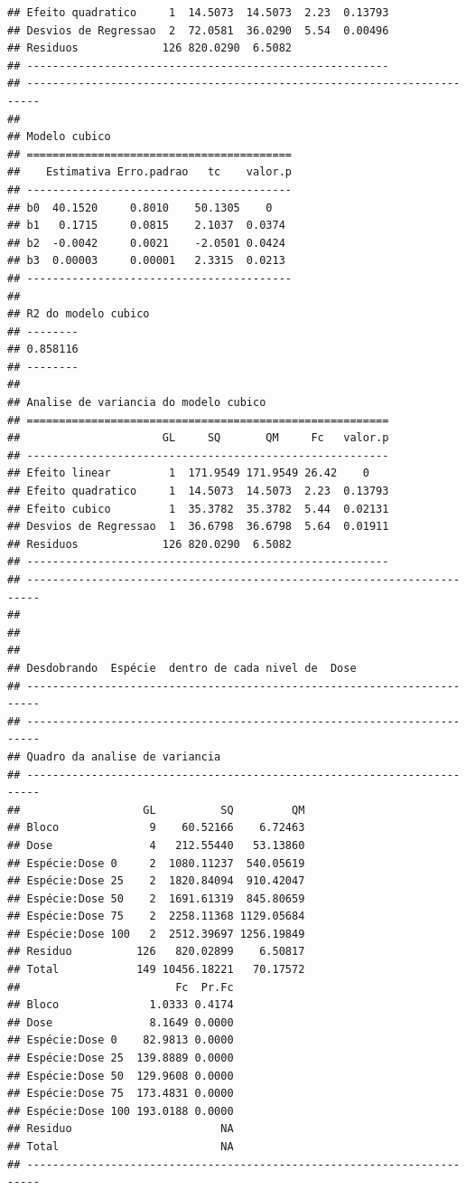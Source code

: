 \documentclass[
]{article}
\begin{document}
\begin{verbatim}
## Efeito quadratico     1  14.5073  14.5073  2.23  0.13793
## Desvios de Regressao  2  72.0581  36.0290  5.54  0.00496
## Residuos             126 820.0290  6.5082               
## --------------------------------------------------------
## ------------------------------------------------------------------------
## 
## Modelo cubico
## =========================================
##    Estimativa Erro.padrao   tc    valor.p
## -----------------------------------------
## b0  40.1520     0.8010    50.1305    0   
## b1   0.1715     0.0815    2.1037  0.0374 
## b2  -0.0042     0.0021    -2.0501 0.0424 
## b3  0.00003     0.00001   2.3315  0.0213 
## -----------------------------------------
## 
## R2 do modelo cubico
## --------
## 0.858116
## --------
## 
## Analise de variancia do modelo cubico
## ========================================================
##                      GL     SQ       QM     Fc   valor.p
## --------------------------------------------------------
## Efeito linear         1  171.9549 171.9549 26.42    0   
## Efeito quadratico     1  14.5073  14.5073  2.23  0.13793
## Efeito cubico         1  35.3782  35.3782  5.44  0.02131
## Desvios de Regressao  1  36.6798  36.6798  5.64  0.01911
## Residuos             126 820.0290  6.5082               
## --------------------------------------------------------
## ------------------------------------------------------------------------
## 
## 
## 
## Desdobrando  Espécie  dentro de cada nivel de  Dose 
## ------------------------------------------------------------------------
## ------------------------------------------------------------------------
## Quadro da analise de variancia
## ------------------------------------------------------------------------
##                   GL          SQ         QM
## Bloco              9    60.52166    6.72463
## Dose               4   212.55440   53.13860
## Espécie:Dose 0     2  1080.11237  540.05619
## Espécie:Dose 25    2  1820.84094  910.42047
## Espécie:Dose 50    2  1691.61319  845.80659
## Espécie:Dose 75    2  2258.11368 1129.05684
## Espécie:Dose 100   2  2512.39697 1256.19849
## Residuo          126   820.02899    6.50817
## Total            149 10456.18221   70.17572
##                        Fc  Pr.Fc
## Bloco              1.0333 0.4174
## Dose               8.1649 0.0000
## Espécie:Dose 0    82.9813 0.0000
## Espécie:Dose 25  139.8889 0.0000
## Espécie:Dose 50  129.9608 0.0000
## Espécie:Dose 75  173.4831 0.0000
## Espécie:Dose 100 193.0188 0.0000
## Residuo                       NA
## Total                         NA
## ------------------------------------------------------------------------

\end{verbatim}
\end{document}

